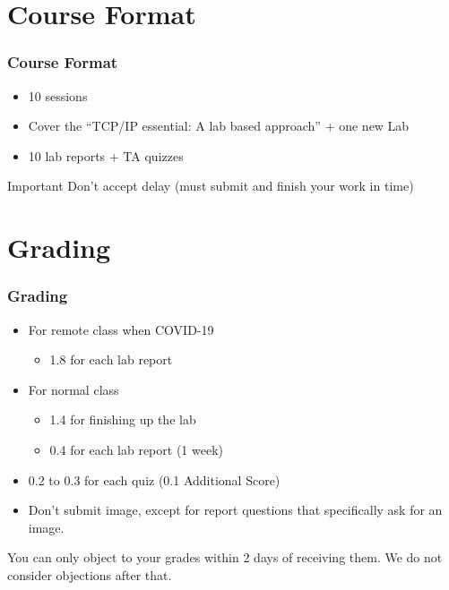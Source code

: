 \documentclass[aspectratio=169,15pt]{beamer}
\begin{document}
\section{Course Format}
\begin{frame}
    \frametitle{Course Format}

    \begin{itemize}
        \item 10 sessions
        \item Cover the “TCP/IP essential: A lab based approach” + one new Lab
        \item 10 lab reports + TA quizzes
    \end{itemize}
    \begin{alertblock}{Important}
        Don’t accept delay (must submit and finish your work in time)
    \end{alertblock}

\end{frame}

\section{Grading}
\begin{frame}
    \frametitle{Grading}

    \begin{itemize}
        \item For remote class when \alert{COVID-19}
        \begin{itemize}
            \item {\color{red} 1.8} for each lab report
        \end{itemize}
        \item For normal class
        \begin{itemize}
            \item {\color{red} 1.4} for finishing up the lab
            \item {\color{red} 0.4} for each lab report (1 week)
        \end{itemize}
        \item {\color{red} 0.2} to {\color{red} 0.3} for each quiz (0.1 Additional Score)
        \item Don’t submit image, except for report questions that specifically ask for an image.
        
    \end{itemize}
    \begin{block}{}
        You can only object to your grades within {\color{red} 2 days} of receiving them. We do not consider objections after that.
    \end{block}

\end{frame}
\end{document}
